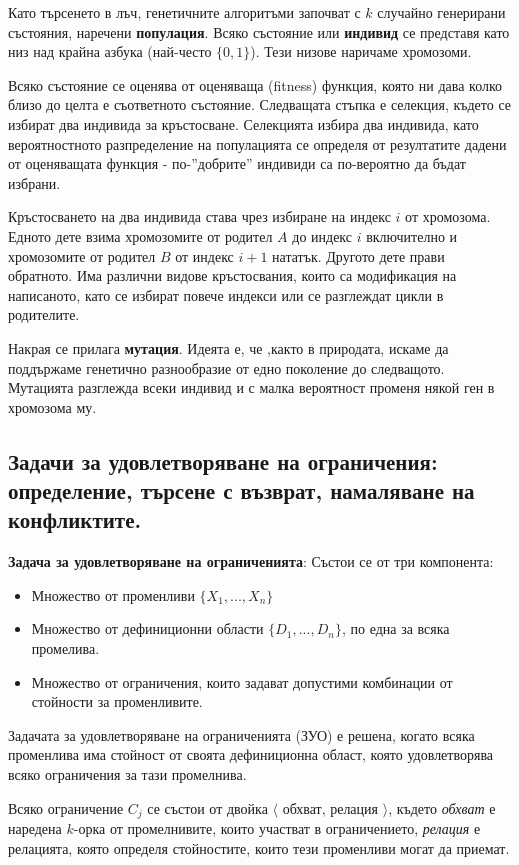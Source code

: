 \documentclass{article}
\renewcommand{\\}{\newline}
\begin{document}
Като търсенето в лъч, генетичните алгоритъми започват с \(k\) случайно генерирани състояния, наречени \textbf{популация}. Всяко състояние или \textbf{индивид} се представя като низ над крайна азбука (най-често \(\{0,1\}\)). Тези низове наричаме хромозоми. 

Всяко състояние се оценява от оценяваща (fitness) функция, която ни дава колко близо до целта е съответното състояние. Следващата стъпка е селекция, където се избират два индивида за кръстосване. Селекцията избира два индивида, като вероятностното разпределение на популацията се определя от резултатите дадени от оценяващата функция - по-''добрите'' индивиди са по-вероятно да бъдат избрани. 

Кръстосването на два индивида става чрез избиране на индекс \(i\)   от хромозома. Едното дете взима хромозомите от родител \(A\) до индекс \(i\) включително и хромозомите от родител \(B\) от индекс \(i+1\) нататък. Другото дете прави обратното. Има различни видове кръстосвания, които са модификация на написаното, като се избират повече индекси или се разглеждат цикли в родителите.

Накрая се прилага \textbf{мутация}. Идеята е, че ,както в природата, искаме да поддържаме генетично разнообразие от едно поколение до следващото. Мутацията разглежда всеки индивид и с малка вероятност променя някой ген в хромозома му.


\subsection{Задачи за удовлетворяване на ограничения: определение, търсене с възврат, намаляване на конфликтите.}

\textbf{Задача за удовлетворяване на ограниченията}: Състои се от три компонента: \begin{itemize}
    \item Множество от променливи \(\{X_1, ..., X_n\}\) 
    \item Множество от дефиниционни области \(\{D_1, ..., D_n\}\), по една за всяка промелива.
    \item Множество от ограничения, които задават допустими комбинации от стойности за променливите.
\end{itemize}

Задачата за удовлетворяване на ограниченията (ЗУО) е решена, когато всяка променлива има стойност от своята дефиниционна област, която удовлетворява всяко ограничения за тази промелнива. 

Всяко ограничение \(C_{j}\) се състои от двойка \(\langle \text{ обхват, релация }\rangle\), където \textit{обхват} е наредена \(k\)-орка от промелнивите, които участват в ограничението, \textit{релация} е релацията, която определя стойностите, които тези променливи могат да приемат.    
\end{document}
